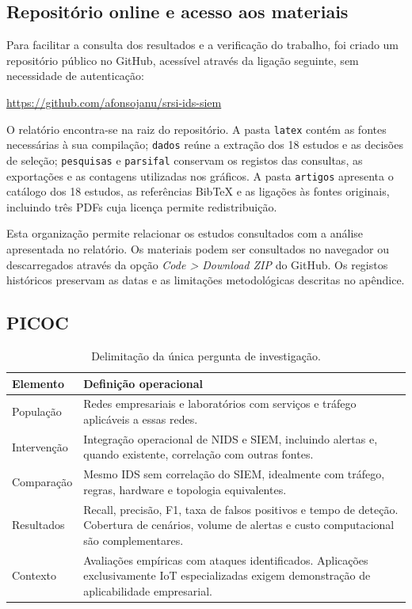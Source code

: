 \documentclass[11pt,a4paper]{article}
\begin{document}
\subsection{Repositório online e acesso aos materiais}
Para facilitar a consulta dos resultados e a verificação do trabalho, foi criado um repositório público no GitHub, acessível através da ligação seguinte, sem necessidade de autenticação:
\begin{center}
\url{https://github.com/afonsojanu/srsi-ids-siem}
\end{center}
O relatório encontra-se na raiz do repositório. A pasta \texttt{latex} contém as fontes necessárias à sua compilação; \texttt{dados} reúne a extração dos 18 estudos e as decisões de seleção; \texttt{pesquisas} e \texttt{parsifal} conservam os registos das consultas, as exportações e as contagens utilizadas nos gráficos. A pasta \texttt{artigos} apresenta o catálogo dos 18 estudos, as referências BibTeX e as ligações às fontes originais, incluindo três PDFs cuja licença permite redistribuição.

Esta organização permite relacionar os estudos consultados com a análise apresentada no relatório. Os materiais podem ser consultados no navegador ou descarregados através da opção \textit{Code > Download ZIP} do GitHub. Os registos históricos preservam as datas e as limitações metodológicas descritas no apêndice.

\subsection{PICOC}
\begin{table}[H]\centering\small
\begin{tabularx}{\linewidth}{@{}p{2.5cm}Y@{}}\toprule
Elemento & Definição operacional\\\midrule
População & Redes empresariais e laboratórios com serviços e tráfego aplicáveis a essas redes.\\
Intervenção & Integração operacional de NIDS e SIEM, incluindo alertas e, quando existente, correlação com outras fontes.\\
Comparação & Mesmo IDS sem correlação do SIEM, idealmente com tráfego, regras, hardware e topologia equivalentes.\\
Resultados & Recall, precisão, F1, taxa de falsos positivos e tempo de deteção. Cobertura de cenários, volume de alertas e custo computacional são complementares.\\
Contexto & Avaliações empíricas com ataques identificados. Aplicações exclusivamente IoT especializadas exigem demonstração de aplicabilidade empresarial.\\\bottomrule
\end{tabularx}\caption{Delimitação da única pergunta de investigação.}\end{table}
\end{document}
